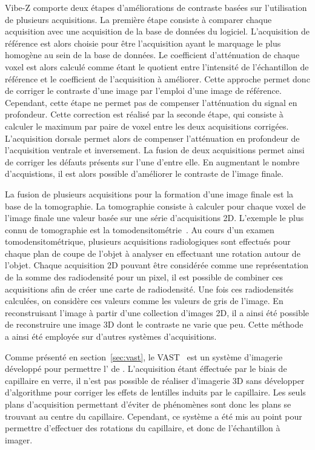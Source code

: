 \documentclass[\main/main.tex]{subfiles}
\begin{document}
%
Vibe-Z comporte deux étapes d'améliorations de contraste basées sur l'utilisation de plusieurs acquisitions. La première étape consiste à comparer chaque acquisition avec une acquisition de la base de données du logiciel.
%
L'acquisition de référence est alors choisie pour être l'acquisition ayant le marquage le plus homogène au sein de la base de données.
%
Le coefficient d'atténuation de chaque voxel est alors calculé comme étant le quotient entre l'intensité de l'échantillon de référence et le coefficient de l'acquisition à améliorer.
%
Cette approche permet donc de corriger le contraste d'une image par l'emploi d'une image de référence.
%
Cependant, cette étape ne permet pas de compenser l'atténuation du signal en profondeur.
%
Cette correction est réalisé par la seconde étape, qui consiste à calculer le maximum par paire de voxel entre les deux acquisitions corrigées.
%
L'acquisition dorsale permet alors de compenser l'atténuation en profondeur de l'acquisition ventrale et inversement.
%
La fusion de deux acquisitions permet ainsi de corriger les défauts présents sur l'une d'entre elle.
%
En augmentant le nombre d'acquistions, il est alors possible d'améliorer le contraste de l'image finale.

%
La fusion de plusieurs acquisitions pour la formation d'une image finale est la base de la tomographie.
%
La tomographie consiste à calculer pour chaque voxel de l'image finale une valeur basée sur une série d'acquisitions 2D.
%
L'exemple le plus connu de tomographie est la tomodensitométrie~\cite{hounsfield_1973}.
%
Au cours d'un examen tomodensitométrique, plusieurs acquisitions radiologiques sont effectués pour chaque plan de coupe de l'objet à analyser en effectuant une rotation autour de l'objet.
%
Chaque acquisition 2D pouvant être considérée comme une représentation de la somme des radiodensité pour un pixel,
il est possible de combiner ces acquisitions afin de créer une carte de radiodensité.
%
Une fois ces radiodensités calculées, on considère ces valeurs comme les valeurs de gris de l'image.
%
En reconstruisant l'image à partir d'une collection d'images 2D, il a ainsi été possible de reconstruire une image 3D dont le contraste ne varie que peu.
%
Cette méthode a ainsi été employée sur d'autres systèmes d'acquisitions.

%
Comme présenté en section~\ref{sec:vast}, le VAST~\cite{pardomartin_2010} est un système d'imagerie développé pour permettre l'\hti{} de \pz{}.
%
L'acquisition étant éffectuée par le biais de capillaire en verre, il n'est pas possible de réaliser d'imagerie 3D sans développer d'algorithme pour corriger les effets de lentilles induits par le capillaire.
%
Les seuls plans d'acquisition permettant d'éviter de phénomènes sont donc les plans se trouvant au centre du capillaire.
%
Cependant, ce système a été mis au point pour permettre d'effectuer des rotations du capillaire, et donc de l'échantillon à imager.
\end{document}
